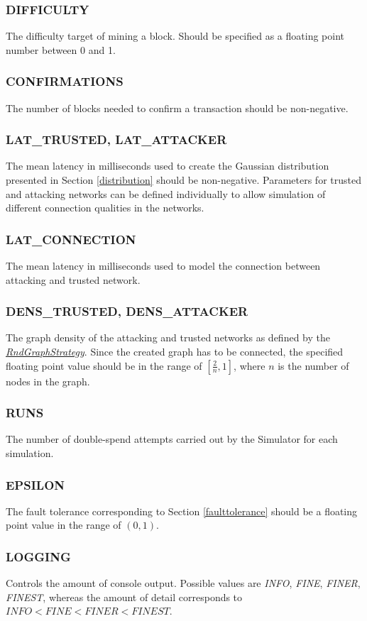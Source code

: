 \documentclass[a4paper,12pt,twoside]{report}
\begin{document}
\subsubsection{DIFFICULTY}
The difficulty target of mining a block. Should be specified as a floating point number between 0 and 1.
\subsubsection{CONFIRMATIONS}
The number of blocks needed to confirm a transaction should be non-negative.
\subsubsection{LAT\_TRUSTED, LAT\_ATTACKER}
The mean latency in milliseconds used to create the Gaussian distribution presented in Section \ref{distribution} should be non-negative. Parameters for trusted and attacking networks can be defined individually to allow simulation of different connection qualities in the networks.
\subsubsection{LAT\_CONNECTION}
The mean latency in milliseconds used to model the connection between attacking and trusted network.
\subsubsection{DENS\_TRUSTED, DENS\_ATTACKER}
The graph density of the attacking and trusted networks as defined by the \hyperref[rndgraphstrategy]{\textit{RndGraphStrategy}}. Since the created graph has to be connected, the specified floating point value should be in the range of $[\frac{2}{n}, 1]$, where $n$ is the number of nodes in the graph.
\subsubsection{RUNS}
The number of double-spend attempts carried out by the Simulator for each simulation.
\subsubsection{EPSILON}
The fault tolerance corresponding to Section \ref{faulttolerance} should be a floating point value in the range of $(0, 1)$.
\subsubsection{LOGGING}
Controls the amount of console output. Possible values are \textit{INFO}, \textit{FINE}, \textit{FINER}, \textit{FINEST}, whereas the amount of detail corresponds to $\textit{INFO} < \textit{FINE} < \textit{FINER} < \textit{FINEST}$.
\end{document}
